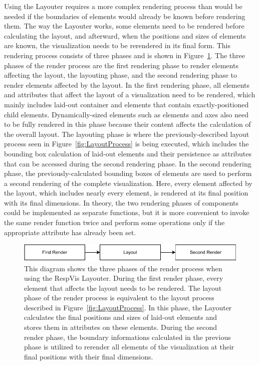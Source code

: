 Using the Layouter requires a more complex rendering process than would be needed if the boundaries of elements would already be known before rendering them.
The way the Layouter works, some elements need to be rendered before calculating the layout, and afterward, when the positions and sizes of elements are known, the visualization needs to be rerendered in its final form. 
This rendering process consists of three phases and is shown in Figure~\ref{fig:RenderProcess}.
The three phases of the render process are the first rendering phase to render elements affecting the layout, the layouting phase, and the second rendering phase to render elements affected by the layout.
In the first rendering phase, all elements and attributes that affect the layout of a visualization need to be rendered, which mainly includes laid-out container  and  elements that contain exactly-positioned child elements.
Dynamically-sized elements such as  elements and axes also need to be fully rendered in this phase because their content affects the calculation of the overall layout.
The layouting phase is where the previously-described layout process seen in Figure~\ref{fig:LayoutProcess} is being executed, which includes the bounding box calculation of laid-out elements and their persistence as attributes that can be accessed during the second rendering phase.
In the second rendering phase, the previously-calculated bounding boxes of elements are used to perform a second rendering of the complete visualization.
Here, every element affected by the layout, which includes nearly every element, is rendered at its final position with its final dimensions.
In theory, the two rendering phases of components could be implemented as separate functions, but it is more convenient to invoke the same render function twice and perform some operations only if the appropriate  attribute has already been set.


\begin{figure}[tp]
\centering
\includegraphics[keepaspectratio,width=\linewidth,height=\fullh]{diagrams/respvis-render-process.pdf}
\caption[Render Process When Using the Layouter]{
  This diagram shows the three phases of the render process when using the RespVis Layouter. 
  During the first render phase, every element that affects the layout needs to be rendered.
  The layout phase of the render process is equivalent to the layout process described in Figure~\ref{fig:LayoutProcess}.
  In this phase, the Layouter calculates the final positions and sizes of laid-out elements and stores them in attributes on these elements.
  During the second render phase, the boundary informations calculated in the previous phase is utilized to rerender all elements of the visualization at their final positions with their final dimensions.
}
\label{fig:RenderProcess}
\end{figure}


